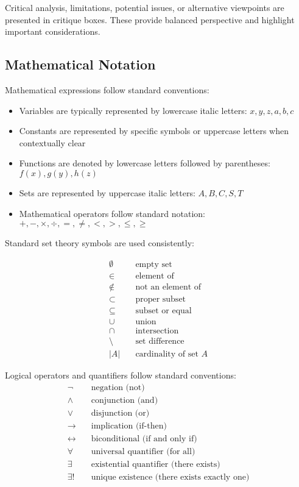 \begin{critique}
    Critical analysis, limitations, potential issues, or alternative viewpoints are presented in critique boxes.
    These provide balanced perspective and highlight important considerations.
\end{critique}

\subsection*{Mathematical Notation}\label{subsec:mathematical-notation}
Mathematical expressions follow standard conventions:
\begin{itemize}
    \item Variables are typically represented by lowercase italic letters: $x, y, z, a, b, c$
    \item Constants are represented by specific symbols or uppercase letters when contextually clear
    \item Functions are denoted by lowercase letters followed by parentheses: $f(x), g(y), h(z)$
    \item Sets are represented by uppercase italic letters: $A, B, C, S, T$
    \item Mathematical operators follow standard notation: $+, -, \times, \div, =, \neq, <, >, \leq, \geq$
\end{itemize}

Standard set theory symbols are used consistently:

\begin{align}
    \emptyset &\quad \text{empty set} \\
    \in &\quad \text{element of} \\
    \notin &\quad \text{not an element of} \\
    \subset &\quad \text{proper subset} \\
    \subseteq &\quad \text{subset or equal} \\
    \cup &\quad \text{union} \\
    \cap &\quad \text{intersection} \\
    \setminus &\quad \text{set difference} \\
    |A| &\quad \text{cardinality of set } A
\end{align}

Logical operators and quantifiers follow standard conventions:
\begin{align}
    \neg &\quad \text{negation (not)} \\
    \land &\quad \text{conjunction (and)} \\
    \lor &\quad \text{disjunction (or)} \\
    \rightarrow &\quad \text{implication (if-then)} \\
    \leftrightarrow &\quad \text{biconditional (if and only if)} \\
    \forall &\quad \text{universal quantifier (for all)} \\
    \exists &\quad \text{existential quantifier (there exists)} \\
    \exists! &\quad \text{unique existence (there exists exactly one)}
\end{align}

